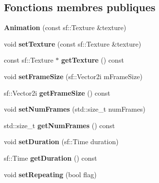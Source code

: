 \subsection*{Fonctions membres publiques}
\begin{DoxyCompactItemize}
\item 
\hypertarget{class_animation_a8f15adab6f0f4f37d0081c3902264334}{}\label{class_animation_a8f15adab6f0f4f37d0081c3902264334} 
{\bfseries Animation} (const sf\+::\+Texture \&texture)
\item 
\hypertarget{class_animation_a3d59fba435978a6531529041d355324b}{}\label{class_animation_a3d59fba435978a6531529041d355324b} 
void {\bfseries set\+Texture} (const sf\+::\+Texture \&texture)
\item 
\hypertarget{class_animation_aceb713113fea1038752e2d0018d0e304}{}\label{class_animation_aceb713113fea1038752e2d0018d0e304} 
const sf\+::\+Texture $\ast$ {\bfseries get\+Texture} () const
\item 
\hypertarget{class_animation_ad36304e4187bba21075bed5d57eb0025}{}\label{class_animation_ad36304e4187bba21075bed5d57eb0025} 
void {\bfseries set\+Frame\+Size} (sf\+::\+Vector2i m\+Frame\+Size)
\item 
\hypertarget{class_animation_ac94ce8b9abad85d686aec3ec8d05cd9f}{}\label{class_animation_ac94ce8b9abad85d686aec3ec8d05cd9f} 
sf\+::\+Vector2i {\bfseries get\+Frame\+Size} () const
\item 
\hypertarget{class_animation_aa056c5b431eb078bc7d36eacb12b299c}{}\label{class_animation_aa056c5b431eb078bc7d36eacb12b299c} 
void {\bfseries set\+Num\+Frames} (std\+::size\+\_\+t num\+Frames)
\item 
\hypertarget{class_animation_a9248e3726c272391ffaf1331bb72c3bf}{}\label{class_animation_a9248e3726c272391ffaf1331bb72c3bf} 
std\+::size\+\_\+t {\bfseries get\+Num\+Frames} () const
\item 
\hypertarget{class_animation_a168c112e11c1fe0040885cea8127dd83}{}\label{class_animation_a168c112e11c1fe0040885cea8127dd83} 
void {\bfseries set\+Duration} (sf\+::\+Time duration)
\item 
\hypertarget{class_animation_af8f00863383094851acb06d83f7a85e9}{}\label{class_animation_af8f00863383094851acb06d83f7a85e9} 
sf\+::\+Time {\bfseries get\+Duration} () const
\item 
\hypertarget{class_animation_ac6e19fdb858aab0b2b2f7e37d6976438}{}\label{class_animation_ac6e19fdb858aab0b2b2f7e37d6976438} 
void {\bfseries set\+Repeating} (bool flag)
\item 

\end{DoxyCompactItemize}
